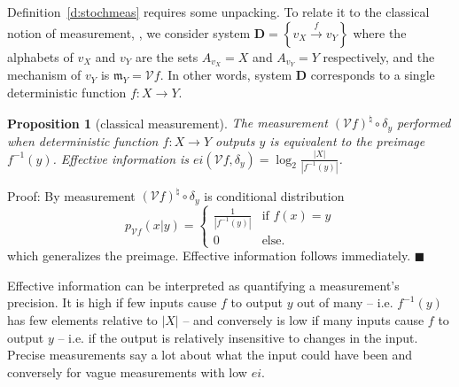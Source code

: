 \documentclass[12pt]{article}
\newcommand{\vecify}{{\mathcal V}}
\newcommand{\Act}{{A}}
\newcommand{\univ}{{\mathbf D}}
\newcommand{\eop}{{$\blacksquare$}}
\newcommand{\fm}{{\mathfrak m}}
\newtheorem{prop}[thm]{Proposition}
\theoremstyle{remark}
\begin{document}
Definition~\ref{d:stochmeas} requires some unpacking. To relate
it to the classical notion of measurement, %
, 
we consider system $\univ=\left\{v_X\xrightarrow{f}v_Y\right\}$
where the alphabets of $v_X$ and $v_Y$ are the sets 
$\Act_{v_X}=X$ and $\Act_{v_Y}=Y$ respectively, and the 
mechanism of $v_Y$ is $\fm_Y=\vecify f$. In other words, 
system $\univ$ corresponds to a single deterministic function 
$f:X\rightarrow Y$.

\begin{prop}
	[classical measurement]
	\label{t:classmeas}
	The measurement $(\vecify f)^\natural\circ \delta_y$ 
    performed when deterministic function $f:X\rightarrow Y$ 
    outputs $y$ is equivalent to the preimage $f^{-1}(y)$. 
    Effective information is $ei(\vecify f,\delta_y)=
    \log_2\frac{|X|}{|f^{-1}(y)|}$.
\end{prop}

\noindent
Proof:
By %
measurement $(\vecify f)^\natural\circ \delta_y$ is conditional
distribution
\begin{equation*}
	p_{\vecify f}(x|y) = \left\{\begin{matrix}
		\frac{1}{|f^{-1}(y)|} & \mbox{if } f(x)=y\\
		0 &\mbox{else}.
	\end{matrix}\right.
\end{equation*}
which generalizes the preimage. Effective information follows 
immediately.
\eop

Effective information can be interpreted as quantifying a 
measurement's precision. It is high if few inputs cause $f$ 
to output $y$ out of many  -- i.e. $f^{-1}(y)$ has few 
elements relative to $|X|$  -- and conversely is low if many 
inputs cause $f$ to output $y$ -- i.e. if the output is 
relatively insensitive to changes in the input. Precise 
measurements say a lot about what the input could have been 
and conversely for vague measurements with low $ei$.
\end{document}
